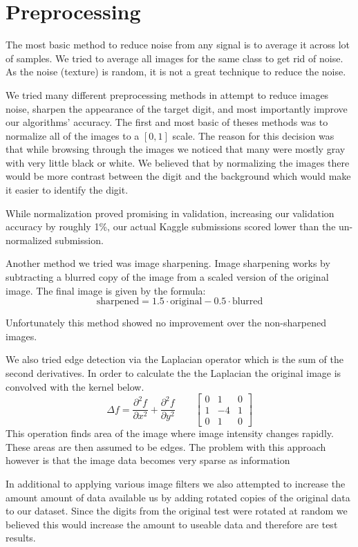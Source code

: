 \documentclass[10pt,twocolumn]{article}
\begin{document}
\section{Preprocessing}
The most basic method to reduce noise from any signal is to average it across lot of samples.  We tried to average all images for the same class to get rid of noise. As the noise (texture) is random, it is not a great technique to reduce the noise.

We tried many different preprocessing methods in attempt to reduce images noise, sharpen the appearance of the target digit, and most importantly improve our algorithms' accuracy. The first and most basic of theses methods was to normalize all of the images to a $[0,1]$ scale. The reason for this decision was that while browsing through the images we noticed that many were mostly gray with very little black or white. We believed that by normalizing the images there would be more contrast between the digit and the background which would make it easier to identify the digit.

While normalization proved promising in validation, increasing our validation accuracy by roughly 1\%, our actual Kaggle submissions scored lower than the un-normalized submission.

Another method we tried was image sharpening. Image sharpening works by subtracting a blurred copy of the image from a scaled version of the original image. The final image is given by the formula: \[\text{sharpened} = 1.5 \cdot \text{original} - 0.5 \cdot \text{blurred}\]

Unfortunately this method showed no improvement over the non-sharpened images.

We also tried edge detection via the Laplacian operator which is the sum of the second derivatives. In order to calculate the the Laplacian the original image is convolved with the kernel  below.
\[\Delta f = \frac{\partial^2 f}{\partial x^2} + \frac{\partial^2 f}{\partial y^2}
\qquad
\begin{bmatrix}
0 & 1 & 0 \\
1 & -4 & 1 \\
0 & 1 & 0
\end{bmatrix}
\]
This operation finds area of the image where image intensity changes rapidly. These areas are then assumed to be edges. The problem with this approach however is that the image data becomes very sparse as information 

In additional to applying various image filters we also attempted to increase the amount amount of data available us by adding rotated copies of the original data to our dataset. Since the digits from the original test were rotated at random we believed this would increase the amount to useable data and therefore are test results.
\end{document}
